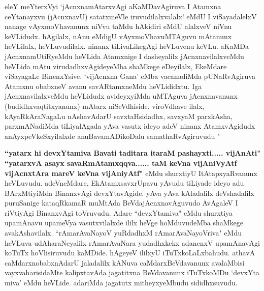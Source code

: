 
\centerline{}

\begin{artha}
eleY meYterxVyi `jAcnxnamAtarxvAgi aKaMDavAgiruva I Atamxna ceYtanayxvu 
(jAcnxnavU) satatxmeVle iruvudilalxvalalx! eMdU I viSayadalelxV nanage\break 
vAyxmoVhavanunx niVvu taMdu hAkidiri eMdU alalxveV niVnu keVLidudx. hAgilalx, 
nAnu eMdigU vAyxmoVhavuMTAguvu mAtanunx heVLilalx, heVLuvudilalx. ninanx 
tiLivaLikegAgi heVLuvenu keVLu. aKaMDa jAcnxnamUtiRyeMdu heVLida Atamxnige I 
dasheyalilx jAcnxnavilalxveMdu heVLida mAtu virudadhxvAgideyeMba shaMkege 
eDeyilalx, EkeMdare viSayagaLe BinenxYsive. `vijAcnxna Gana' eMba vacanadiMda 
pUNaRvAgiruva Atamxnu obabxneV avanu savARtamxneMdu heVLididxtu. Iga 
jAcnxnavilalxveMdu heVLidudx avideyxyiMda uMTAguva jAcnxnavanunx 
(budidhxvaqtitxyanunx) mAtarx niSeVdhiside. viroVdhave ilalx, kAyaRkAraNagaLu 
nAshavAdarU savxtaHsidadhx, savxyaM parxkAsha, parxmANadiMda tiLiyalAgada yAva 
vasutx ideyo adeV ninanx AtamxvAgidudx anAyxpeVkeSxyilalxde anuBavamADikoDalu 
samathaRvAgiruvudu "
\end{artha}

\begin{artha}
\textbf{``yatarx hi devxYtamiva Bavati taditara itaraM pashayxti..... vijAnAti"  ``yatarxvA asayx savaRmAtamxqqva...... taM keVna vijAniVyAtf vijAcnxtAra mareV keVna vijAniyAtf"} eMdu shurxtiyU ItAtapxyaRvanunx heVLuvudu. adeVneMdare, 
EkAtamxsavxrUpavu yAvudu tiLiyade ideyo adu BArxMtiyiMda BinanxvAgi  
devxYtavAgide. yAva yAva kAladalilx deVshadalilx puruSanige kataqRkamaR muMtAda 
BeVdajAcnxnavAguvudo AvAgaleV I riVtiyAgi BinanxvAgi toVruvudu. Adare 
``devxYtamiva" eMdu shurxtiya upamAnavu upameVya vasutxvilalxde ililx heVge 
hoMduvudeMba shaMkege avakAshavilalx. ``rAmarAvaNayoV yuRdadhxM rAmarAvaNayoVriva" eMdu heVLuva udAharaNeyalilx 
rAmarAvaNara yudadhxkekx adanenxV upamAnavAgi koTuTx hoVlisiruvudu kaMDide. 
hAgeyeV ililxyU iTuTxkoLaLxbahudu. athavA caMdarxnobabxnAdarU jaladalilx kANuva 
caMdarxBeVdavanunx avalaMbisi vayxvaharisidaMte kalipxtavAda jagatitxna 
BeVdavanunx iTuTxkoMDu `devxYta miva' eMdu heVLide. adariMda jagatutx 
mitheyxyeMbudu sididhxsuvudu. 
\end{artha}

